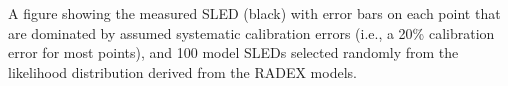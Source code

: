 \label{fig:SLED_samples}
A figure showing the measured SLED (black) with error bars on each point that
are dominated by assumed systematic calibration errors (i.e., a 20\%
calibration error for most points), and 100 model SLEDs selected randomly from
the likelihood distribution derived from the RADEX models.
